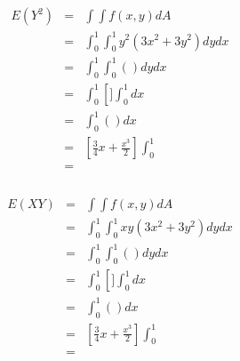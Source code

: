 \begin{eqnarray*}
E(Y^2) &=& \int\int f(x,y)dA \\
&=& \int^{1}_{0}\int^{1}_{0} y^2(3x^2 + 3y^2)dydx\\
&=& \int^{1}_{0}\int^{1}_{0} (  )dydx\\
&=& \int^{1}_{0}\left[  ]\int^{1}_{0}dx\\
&=& \int^{1}_{0} (   )dx\\
&=& \left[\frac{3}{4}x+\frac{x^3}{2}\right]\int^{1}_{0}\\
&=& \frac{}{}\\
\end{eqnarray*}



\begin{eqnarray*}
E(XY) &=& \int\int f(x,y)dA \\
&=& \int^{1}_{0}\int^{1}_{0} xy(3x^2 + 3y^2)dydx\\
&=& \int^{1}_{0}\int^{1}_{0} (  )dydx\\
&=& \int^{1}_{0}\left[  ]\int^{1}_{0}dx\\
&=& \int^{1}_{0} (   )dx\\
&=& \left[\frac{3}{4}x+\frac{x^3}{2}\right]\int^{1}_{0}\\
&=& \frac{}{}\\
\end{eqnarray*}

